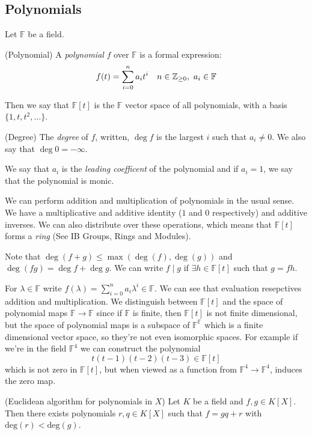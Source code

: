\documentclass{article}
\newcommand{\F}{\mathbb{F}}
\begin{document}
\subsection{Polynomials}
Let $ \F $ be a field.
\begin{definition}
	(Polynomial) A \textit{polynomial} $ f $ over $ \F $ is a formal expression:
	\[
		f(t)=\sum_{i=0}^na_it^i\quad n\in \Z_{\ge 0},\ a_i\in \F
	\]
\end{definition}
Then we say that $ \F[t] $ is the $ \F $ vector space of all polynomials, with a basis $ \{1,t,t^2,\dots\} $.
\begin{definition}
	(Degree) The \textit{degree} of $ f $, written, $ \deg f $ is the largest $ i $ such that $ a_i\ne 0 $. We also say that $ \deg 0 = -\infty $.
\end{definition}
We say that $ a_i $ is the \textit{leading coefficent} of the polynomial and if $ a_i=1 $, we say that the polynomial is monic.\par
We can perform addition and multiplication of polynomials in the usual sense. We have a multiplicative and additive identity ($ 1 $ and $ 0 $ respectively) and additive inverses. We can also distribute over these operations, which means that $ \F[t] $ forms a \textit{ring} (See IB Groups, Rings and Modules).\par
Note that $ \deg(f+g)\le \max(\deg(f),\deg(g)) $ and $ \deg(fg)=\deg f + \deg g $. We can write $ f\mid g $ if $ \exists h\in \F[t] $ such that $ g=fh $.\par
For $ \lambda\in \F $ write $ f(\lambda)=\sum_{i=0}^na_i\lambda^i \in \F $. We can see that evaluation resepctives addition and multiplication. We distinguish between $ \F[t] $ and the space of polynomial maps $ \F\to \F $ since if $ \F $ is finite, then $ \F[t] $ is not finite dimensional, but the space of polynomial maps is a subspace of $ \F^\F $ which is a finite dimensional vector space, so they're not even isomorphic spaces. For example if we're in the field $ \F^4 $ we can construct the polynomial
\[
	t(t-1)(t-2)(t-3)\in \F[t]
\]
which is not zero in $ \F[t] $, but when viewed as a function from $ \F^4\to\F^4 $, induces the zero map.
\begin{proposition}                                                                  (Euclidean algorithm for polynomials in $ X $) Let $ K $ be a field and $ f,g\in K[X] $. Then there exists polynomials $ r,q\in K[X] $ such that $ f=gq+r $ with $ \mathrm{deg}(r)<\mathrm{deg}(g) $.                          \end{proposition}
\end{document}
